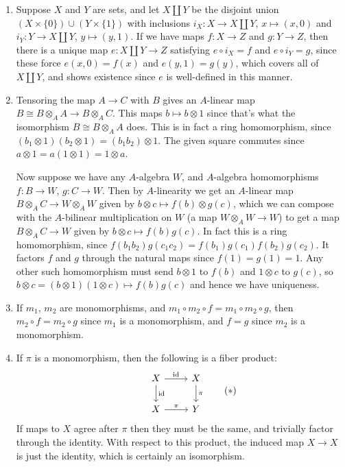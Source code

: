 \documentclass{report}
\newcommand{\id}{{\mathrm{id}}} %
\begin{document}
\begin{enumerate}[label=\textbf{1.3.\Alph*.}]
	\item Suppose $X$ and $Y$ are sets, and let $X\amalg Y$ be the disjoint
	      union $(X\times\{0\})\cup(Y\times\{1\})$ with inclusions
	      $i_X:X\to X\amalg Y$, $x\mapsto(x,0)$ and $i_Y:Y\to X\amalg Y$,
	      $y\mapsto(y,1)$. If we have maps $f:X\to Z$ and $g:Y\to Z$, then
	      there is a unique map $e:X\amalg Y\to Z$ satisfying $e\circ i_X=f$
	      and $e\circ i_Y=g$, since these force $e(x,0)=f(x)$ and $e(y,1)=g(y)$,
	      which covers all of $X\amalg Y$, and shows existence since $e$ is
	      well-defined in this manner.

	\item Tensoring the map $A\to C$ with $B$ gives an $A$-linear map
	      $B\cong B\otimes_AA\to B\otimes_AC$. This maps $b\mapsto b\otimes 1$
	      since that's what the isomorphism $B\cong B\otimes_AA$ does.
	      This is in fact a ring homomorphism, since
	      $(b_1\otimes1)(b_2\otimes1)=(b_1b_2)\otimes1$. The given square
	      commutes since $a\otimes1=a(1\otimes1)=1\otimes a$.

	      Now suppose we have any $A$-algebra $W$, and $A$-algebra
	      homomorphisms $f:B\to W$, $g:C\to W$. Then by $A$-linearity we get
	      an $A$-linear map $B\otimes_AC\to W\otimes_AW$ given by
	      $b\otimes c\mapsto f(b)\otimes g(c)$, which we can compose with the
	      $A$-bilinear multiplication on $W$ (a map $W\otimes_AW\to W$) to get
	      a map $B\otimes_AC\to W$ given by $b\otimes c\mapsto f(b)g(c)$.
	      In fact this is a ring homomorphism, since
	      $f(b_1b_2)g(c_1c_2)=f(b_1)g(c_1)f(b_2)g(c_2)$. It factors $f$ and
	      $g$ through the natural maps since $f(1)=g(1)=1$. Any other such
	      homomorphism must send $b\otimes 1$ to $f(b)$ and $1\otimes c$ to
	      $g(c)$, so $b\otimes c=(b\otimes1)(1\otimes c)\mapsto f(b)g(c)$ and
	      hence we have uniqueness.

	\item If $m_1$, $m_2$ are monomorphisms, and
	      $m_1\circ m_2\circ f=m_1\circ m_2\circ g$, then $m_2\circ f=m_2\circ g$
	      since $m_1$ is a monomorphism, and $f=g$ since $m_2$ is a
	      monomorphism.

	\item If $\pi$ is a monomorphism, then the following is a fiber product:
	      \begin{equation*}
		      \begin{tikzcd}
			      &X \arrow{r}{\id} \arrow{d}{\id} &X \arrow{d}{\pi} \\
			      &X \arrow{r}{\pi} &Y
		      \end{tikzcd}\tag{$*$}
	      \end{equation*}
	      If maps to $X$ agree after $\pi$ then they must be the same, and
	      trivially factor through the identity. With respect to this product,
	      the induced map $X\to X$ is just the identity, which is certainly an
	      isomorphism.


\end{enumerate}
\end{document}
